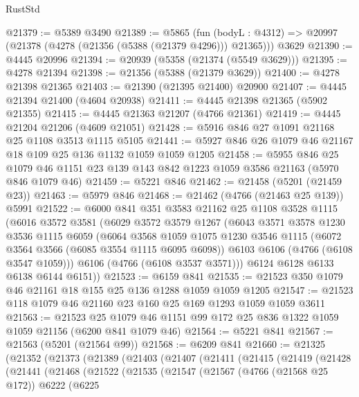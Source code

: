 \begin{lexlean}{RustStd}
\begin{coremodule}
{\begin{coremodule}
{{{{{{{{{{{{{{{{{{{{{{{{{{{{{{{{{{{@21379 := @5389 @3490
@21389 := @5865
    (fun (bodyL : @4312) => @20997 (@21378 (@4278 (@21356 (@5388 (@21379 @4296))) @21365)))
    @3629
@21390 := @4445 @20996
@21394 := @20939 (@5358 (@21374 (@5549 @3629)))
@21395 := @4278 @21394
@21398 := @21356 (@5388 (@21379 @3629))
@21400 := @4278 @21398 @21365
@21403 := @21390 (@21395 @21400) @20900
@21407 := @4445 @21394 @21400 (@4604 @20938)
@21411 := @4445 @21398 @21365 (@5902 @21355)
@21415 := @4445 @21363 @21207 (@4766 @21361)
@21419 := @4445 @21204 @21206 (@4609 @21051)
@21428 := @5916 @846 @27 @1091 @21168 @25 @1108 @3513 @1115 @5105
@21441 := @5927 @846 @26 @1079 @46 @21167 @18 @109 @25 @136 @1132 @1059 @1059 @1205
@21458 := @5955
    @846
    @25
    @1079
    @46
    @1151
    @23
    @139
    @143
    @842
    @1223
    @1059
    @3586
    @21163
    (@5970 @846 @1079 @46)
@21459 := @5221 @846
@21462 := @21458 (@5201 (@21459 @23))
@21463 := @5979 @846
@21468 := @21462 (@4766 (@21463 @25 @139)) @5991
@21522 := @6000
    @841
    @351
    @3583
    @21162
    @25
    @1108
    @3528
    @1115
    (@6016
      @3572
      @3581
      (@6029
        @3572
        @3579
        @1267
        (@6043
          @3571
          @3578
          @1230
          @3536
          @1115
          @6059
          (@6064
            @3568
            @1059
            @1075
            @1230
            @3546
            @1115
            (@6072 @3564 @3566 (@6085 @3554 @1115 @6095 @6098))
            @6103
            @6106
            (@4766 (@6108 @3547 @1059)))
          @6106
          (@4766 (@6108 @3537 @3571)))
        @6124
        @6128
        @6133
        @6138
        @6144
        @6151))
@21523 := @6159 @841
@21535 := @21523 @350 @1079 @46 @21161 @18 @155 @25 @136 @1288 @1059 @1059 @1205
@21547 := @21523 @118 @1079 @46 @21160 @23 @160 @25 @169 @1293 @1059 @1059 @3611
@21563 := @21523
    @25
    @1079
    @46
    @1151
    @99
    @172
    @25
    @836
    @1322
    @1059
    @1059
    @21156
    (@6200 @841 @1079 @46)
@21564 := @5221 @841
@21567 := @21563 (@5201 (@21564 @99))
@21568 := @6209 @841
@21660 := @21325
    (@21352
      (@21373
        (@21389
          (@21403
            (@21407
              (@21411
                (@21415
                  (@21419
                    (@21428
                      (@21441
                        (@21468
                          (@21522
                            (@21535
                              (@21547
                                (@21567
                                  (@4766 (@21568 @25 @172))
                                  @6222
                                  (@6225
}}}}}}}}}}}}}}}}}}}}}}}}}}}}}}}}}}}
\end{coremodule}}
\end{coremodule}
\end{lexlean}
